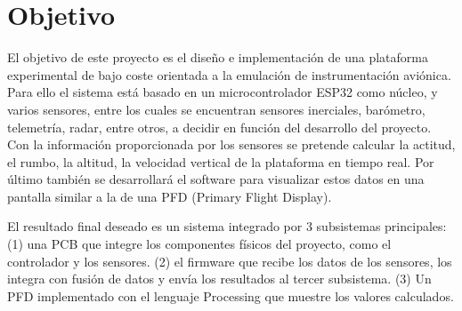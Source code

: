 \chapter{Objetivo}

El objetivo de este proyecto es el diseño e implementación de una plataforma experimental de bajo coste orientada a la emulación de instrumentación aviónica. Para ello el sistema está basado en un microcontrolador ESP32 como núcleo, y varios sensores, entre los cuales se encuentran sensores inerciales, barómetro, telemetría, radar, entre otros, a decidir en función del desarrollo del proyecto. Con la información proporcionada por los sensores se pretende calcular la actitud, el rumbo, la altitud, la velocidad vertical de la plataforma en tiempo real. Por último también se desarrollará el software para visualizar estos datos en una pantalla similar a la de una PFD (Primary Flight Display). \newline
 
El resultado final deseado es un sistema integrado por 3 subsistemas principales: (1) una PCB que integre los componentes físicos del proyecto, como el controlador y los sensores. (2) el firmware que recibe los datos de los sensores, los integra con fusión de datos y envía los resultados al tercer subsistema. (3) Un PFD implementado con el lenguaje Processing que muestre los valores calculados. 



